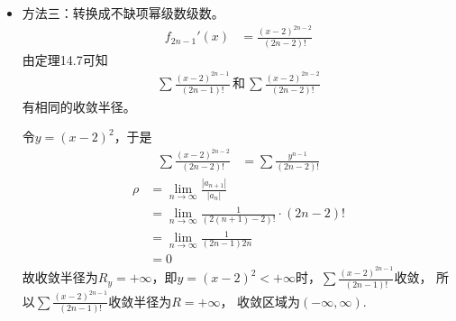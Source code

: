 \documentclass{article}
\begin{document}
\begin{itemize}
\begin{itemize}
          \item 方法三：转换成不缺项幂级数级数。
                \begin{align*}
                  f_{2n - 1}'(x)
                   & = \frac{(x - 2)^{2n -2}}{(2n - 2)!}
                \end{align*}
                由定理14.7可知
                \begin{align*}
                  \sum \frac{(x - 2)^{2n - 1}}{(2n - 1)!} \, \text{和} \, \sum \frac{(x - 2)^{2n -2}}{(2n - 2)!}
                \end{align*}
                有相同的收敛半径。

                令$y = (x - 2)^2$，于是
                \begin{align*}
                  \sum \frac{(x - 2)^{2n -2}}{(2n - 2)!}
                   & = \sum \frac{y^{n - 1}}{(2n - 2)!}
                \end{align*}
                \begin{align*}
                  \rho
                   & = \lim\limits_{n \to \infty} \frac{|a_{n + 1}|}{|a_n|}                \\
                   & = \lim\limits_{n \to \infty} \frac{1}{(2(n+1) - 2)!} \cdot  (2n - 2)! \\
                   & = \lim\limits_{n \to \infty} \frac{1}{(2n - 1)2n}                     \\
                   & = 0
                \end{align*}
                故收敛半径为$R_y = +\infty$，即$y = (x - 2)^2 < +\infty$时，$\sum \frac{(x - 2)^{2n - 1}}{(2n - 1)!}$收敛，
                所以$\sum \frac{(x - 2)^{2n - 1}}{(2n - 1)!}$收敛半径为$R = +\infty$，
                收敛区域为$(- \infty, \infty)$.
        \end{itemize}


\end{itemize}
\end{document}
